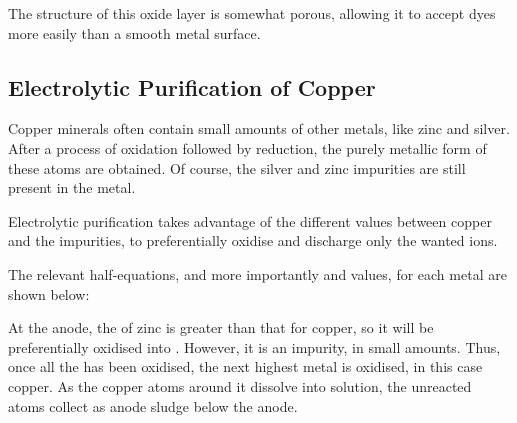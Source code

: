 			The structure of this oxide layer is somewhat porous, allowing it to accept dyes more easily than a smooth metal surface.



		\pagebreak
		\subsection{Electrolytic Purification of Copper}

			Copper minerals often contain small amounts of other metals, like zinc and silver. After a process of oxidation followed by
			reduction, the purely metallic form of these atoms are obtained. Of course, the silver and zinc impurities are still present
			in the metal.

			Electrolytic purification takes advantage of the different \Eo{} values between copper and the impurities, to preferentially
			oxidise and discharge only the wanted ions.


			The relevant half-equations, and more importantly \Eo{} and \Eox{} values, for each metal are shown below:


			At the anode, the \Eox{} of zinc is greater than that for copper, so it will be preferentially oxidised into . However,
			it is an impurity, in small amounts. Thus, once all the  has been oxidised, the next highest \Eox{} metal is oxidised, in
			this case copper. As the copper atoms around it dissolve into solution, the unreacted  atoms collect as anode sludge below
			the anode.

